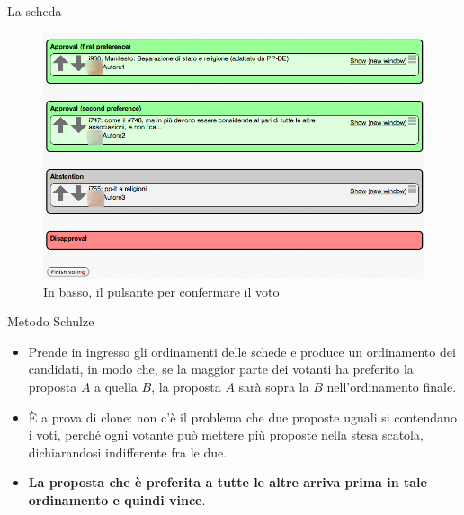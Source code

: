 \documentclass{beamer}
\begin{document}
\begin{frame}{La scheda}
\begin{figure}\includegraphics[width=.9\textwidth]{pics/scheda}
\caption{In basso, il pulsante per confermare il voto}
\end{figure}
\end{frame}

\begin{frame}{Metodo Schulze}
\begin{itemize}
\item Prende in ingresso gli ordinamenti delle schede e produce un ordinamento dei candidati, in modo che, se la maggior parte dei votanti ha preferito la proposta $A$ a quella $B$, la proposta $A$ sar\`a sopra la $B$ nell'ordinamento finale.
\item \`E a prova di clone: non c'\`e il problema che due proposte uguali si contendano i voti, perch\'e ogni votante pu\`o mettere pi\`u proposte nella stesa scatola, dichiarandosi indifferente fra le due.
\item {\bfseries La proposta che \`e preferita a tutte le altre arriva prima in tale ordinamento e quindi vince}.
\end{itemize}
\end{frame}
\end{document}
